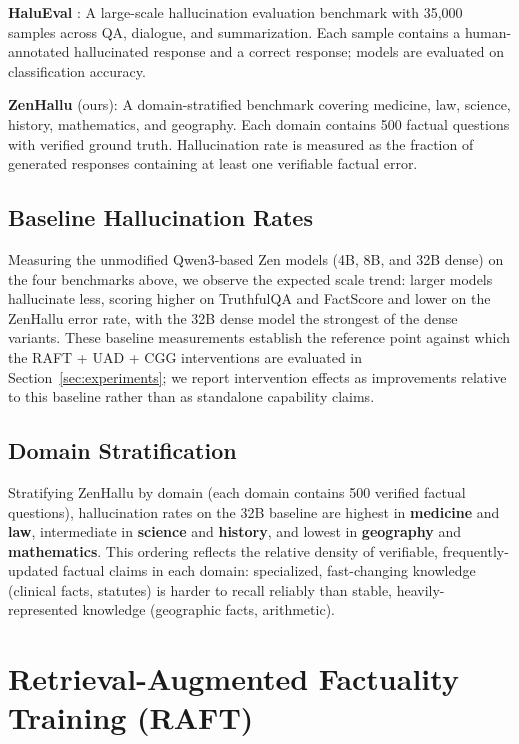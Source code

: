 \documentclass[11pt,a4paper]{article}
\begin{document}
\textbf{HaluEval} \cite{li2023halueval}: A large-scale hallucination evaluation benchmark
with 35,000 samples across QA, dialogue, and summarization. Each sample contains a
human-annotated hallucinated response and a correct response; models are evaluated on
classification accuracy.

\textbf{ZenHallu} (ours): A domain-stratified benchmark covering medicine, law, science,
history, mathematics, and geography. Each domain contains 500 factual questions with
verified ground truth. Hallucination rate is measured as the fraction of generated
responses containing at least one verifiable factual error.

\subsection{Baseline Hallucination Rates}

Measuring the unmodified Qwen3-based Zen models (4B, 8B, and 32B dense) on the four
benchmarks above, we observe the expected scale trend: larger models hallucinate less,
scoring higher on TruthfulQA and FactScore and lower on the ZenHallu error rate, with the
32B dense model the strongest of the dense variants. These baseline measurements
establish the reference point against which the RAFT + UAD + CGG interventions are
evaluated in Section~\ref{sec:experiments}; we report intervention effects as
improvements relative to this baseline rather than as standalone capability claims.

\subsection{Domain Stratification}

Stratifying ZenHallu by domain (each domain contains 500 verified factual questions),
hallucination rates on the 32B baseline are highest in \textbf{medicine} and
\textbf{law}, intermediate in \textbf{science} and \textbf{history}, and lowest in
\textbf{geography} and \textbf{mathematics}. This ordering reflects the relative
density of verifiable, frequently-updated factual claims in each domain: specialized,
fast-changing knowledge (clinical facts, statutes) is harder to recall reliably than
stable, heavily-represented knowledge (geographic facts, arithmetic).

\section{Retrieval-Augmented Factuality Training (RAFT)}
\label{sec:raft}
\end{document}
